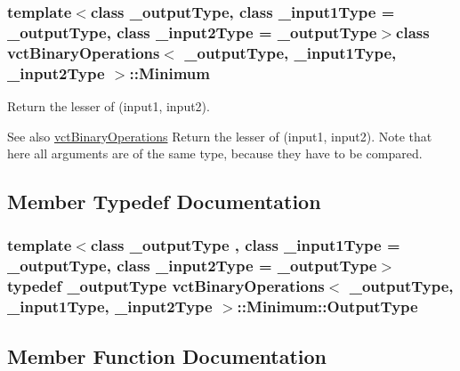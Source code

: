 \subsubsection*{template$<$class \+\_\+output\+Type, class \+\_\+input1\+Type = \+\_\+output\+Type, class \+\_\+input2\+Type = \+\_\+output\+Type$>$class vct\+Binary\+Operations$<$ \+\_\+output\+Type, \+\_\+input1\+Type, \+\_\+input2\+Type $>$\+::\+Minimum}

Return the lesser of (input1, input2). 

\begin{DoxySeeAlso}{See also}
\hyperlink{classvct_binary_operations}{vct\+Binary\+Operations} Return the lesser of (input1, input2). Note that here all arguments are of the same type, because they have to be compared. 
\end{DoxySeeAlso}


\subsection{Member Typedef Documentation}
\hypertarget{classvct_binary_operations_1_1_minimum_a3a43e1925b5600853520784d42b58299}{}
\subsubsection[{Output\+Type}]{\setlength{\rightskip}{0pt plus 5cm}template$<$class \+\_\+output\+Type , class \+\_\+input1\+Type  = \+\_\+output\+Type, class \+\_\+input2\+Type  = \+\_\+output\+Type$>$ typedef \+\_\+output\+Type {\bf vct\+Binary\+Operations}$<$ \+\_\+output\+Type, \+\_\+input1\+Type, \+\_\+input2\+Type $>$\+::{\bf Minimum\+::\+Output\+Type}}\label{classvct_binary_operations_1_1_minimum_a3a43e1925b5600853520784d42b58299}


\subsection{Member Function Documentation}
\hypertarget{classvct_binary_operations_1_1_minimum_a5b1f11cba02d44ef5b613f321e265c85}{}
